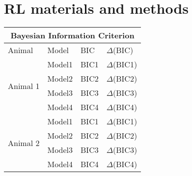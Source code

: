 \chapter{RL materials and methods}
\label{app:RL_MatAndMet}
\begin{table}[h!]
    \centering
\begin{tabular}{ |p{3cm}||p{3cm}|p{2cm}|p{2cm}| }
 \hline
 \multicolumn{4}{|c|}{Bayesian Information Criterion} \\
 \hline
 Animal & Model & BIC & $\Delta$(BIC)\\
 \hline
\multirow{4}{6cm}{Animal 1} &Model1&BIC1&$\Delta$(BIC1)\\&Model2&BIC2&$\Delta$(BIC2)\\&Model3&BIC3&$\Delta$(BIC3)\\&Model4&BIC4&$\Delta$(BIC4)\\
\hline
\multirow{4}{6cm}{Animal 2} &Model1&BIC1&$\Delta$(BIC1)\\&Model2&BIC2&$\Delta$(BIC2)\\&Model3&BIC3&$\Delta$(BIC3)\\&Model4&BIC4&$\Delta$(BIC4)\\
 \hline
\end{tabular}
\end{table}